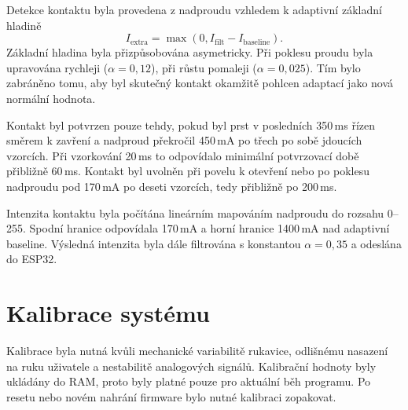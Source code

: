 Detekce kontaktu byla provedena z nadproudu vzhledem k adaptivní základní hladině
\begin{equation}
    I_{\mathrm{extra}} =
    \max\left(0, I_{\mathrm{filt}} - I_{\mathrm{baseline}}\right).
\end{equation}
Základní hladina byla přizpůsobována asymetricky. Při poklesu proudu byla upravována rychleji ($\alpha = 0{,}12$), při růstu pomaleji ($\alpha = 0{,}025$). Tím bylo zabráněno tomu, aby byl skutečný kontakt okamžitě pohlcen adaptací jako nová normální hodnota.

Kontakt byl potvrzen pouze tehdy, pokud byl prst v posledních 350\,ms řízen směrem k zavření a nadproud překročil 450\,mA po třech po sobě jdoucích vzorcích. Při vzorkování 20\,ms to odpovídalo minimální potvrzovací době přibližně 60\,ms. Kontakt byl uvolněn při povelu k otevření nebo po poklesu nadproudu pod 170\,mA po deseti vzorcích, tedy přibližně po 200\,ms.

Intenzita kontaktu byla počítána lineárním mapováním nadproudu do rozsahu 0--255. Spodní hranice odpovídala 170\,mA a horní hranice 1400\,mA nad adaptivní baseline. Výsledná intenzita byla dále filtrována s konstantou $\alpha = 0{,}35$ a odeslána do ESP32.

\section{Kalibrace systému}
\label{sec:kalibrace-systemu-hardware}

Kalibrace byla nutná kvůli mechanické variabilitě rukavice, odlišnému nasazení na ruku uživatele a nestabilitě analogových signálů. Kalibrační hodnoty byly ukládány do RAM, proto byly platné pouze pro aktuální běh programu. Po resetu nebo novém nahrání firmware bylo nutné kalibraci zopakovat.

